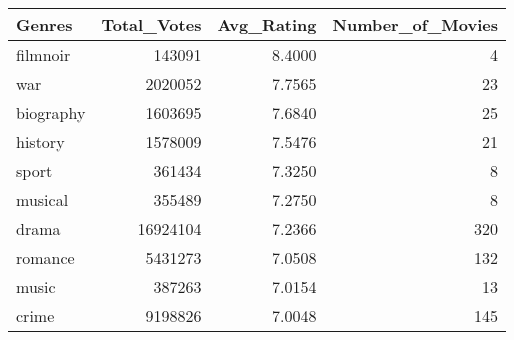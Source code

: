 \begin{tabular}{lrrr}
\toprule
Genres & Total_Votes & Avg_Rating & Number_of_Movies \\
\midrule
filmnoir & 143091 & 8.4000 & 4 \\
war & 2020052 & 7.7565 & 23 \\
biography & 1603695 & 7.6840 & 25 \\
history & 1578009 & 7.5476 & 21 \\
sport & 361434 & 7.3250 & 8 \\
musical & 355489 & 7.2750 & 8 \\
drama & 16924104 & 7.2366 & 320 \\
romance & 5431273 & 7.0508 & 132 \\
music & 387263 & 7.0154 & 13 \\
crime & 9198826 & 7.0048 & 145 \\
\bottomrule
\end{tabular}
